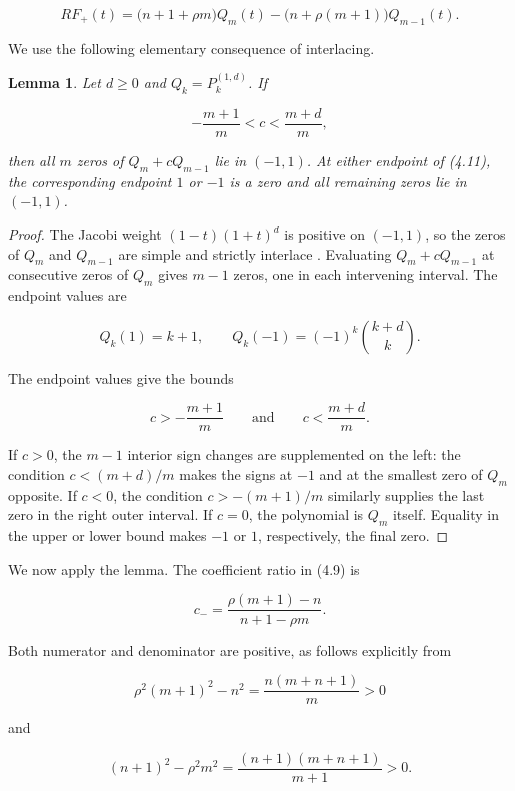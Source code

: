 \documentclass[11pt]{article}
\newtheorem{lemma}[theorem]{Lemma}
\numberwithin{equation}{section}
\begin{document}
\nopagebreak[4]
\[
RF_+(t)=\bigl(n+1+\rho m\bigr)Q_m(t)
-\bigl(n+\rho(m+1)\bigr)Q_{m-1}(t).
\tag{4.10}
\]

We use the following elementary consequence of interlacing.

\Needspace{0.30\textheight}
\begin{lemma}

Let $d\geq0$ and $Q_k=P_k^{(1,d)}$. If

\nopagebreak[4]
\[
-\frac{m+1}{m}<c<\frac{m+d}{m},
\tag{4.11}
\]

then all $m$ zeros of $Q_m+cQ_{m-1}$ lie in $(-1,1)$. At either endpoint of
(4.11), the corresponding endpoint $1$ or $-1$ is a zero and all remaining
zeros lie in $(-1,1)$.

\end{lemma}

\begin{proof}

The Jacobi weight $(1-t)(1+t)^d$ is positive on $(-1,1)$, so the zeros of
$Q_m$ and $Q_{m-1}$ are simple and strictly interlace \cite[Sec.~18.2(vi)]{dlmf}.
Evaluating $Q_m+cQ_{m-1}$ at consecutive zeros of $Q_m$ gives $m-1$ zeros,
one in each intervening interval. The endpoint values are

\nopagebreak[4]
\[
Q_k(1)=k+1,
\qquad
Q_k(-1)=(-1)^k\binom{k+d}{k}.
\]

The endpoint values give the bounds

\nopagebreak[4]
\[
c>-\frac{m+1}{m}
\qquad\text{and}\qquad
c<\frac{m+d}{m}.
\]

If $c>0$, the $m-1$ interior sign changes are supplemented on the left: the
condition $c<(m+d)/m$ makes the signs at $-1$ and at the smallest zero of
$Q_m$ opposite. If $c<0$, the condition $c>-(m+1)/m$ similarly supplies the
last zero in the right outer interval. If $c=0$, the polynomial is $Q_m$
itself. Equality in the upper or lower bound makes $-1$ or $1$, respectively,
the final zero.
\end{proof}


We now apply the lemma. The coefficient ratio in (4.9) is

\nopagebreak[4]
\[
c_-=
\frac{\rho(m+1)-n}{n+1-\rho m}.
\tag{4.12}
\]

Both numerator and denominator are positive, as follows explicitly from

\nopagebreak[4]
\[
\rho^2(m+1)^2-n^2=\frac{n(m+n+1)}m>0
\]

and

\nopagebreak[4]
\[
(n+1)^2-\rho^2m^2
=\frac{(n+1)(m+n+1)}{m+1}>0.
\]
\end{document}
